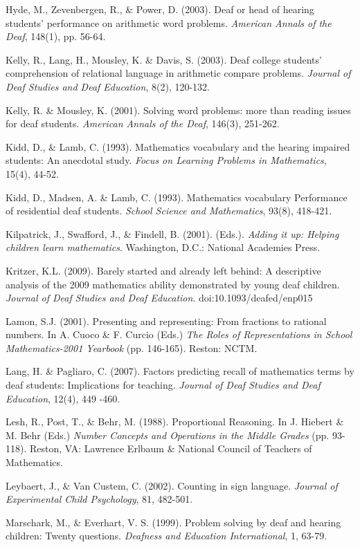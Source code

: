 \documentclass[11.5pt]{sig-alternate} %
\begin{document}
Hyde, M., Zevenbergen, R., \& Power, D. (2003). Deaf or head of hearing students' performance on arithmetic word problems. \textit{American Annals of the Deaf}, 148(1), pp. 56-64.

Kelly, R., Lang, H., Mousley, K. \& Davis, S. (2003). Deaf college students' comprehension of relational language in arithmetic compare problems. \textit{Journal of Deaf Studies and Deaf Education}, 8(2), 120-132.

Kelly, R. \& Mousley, K. (2001). Solving word problems: more than reading issues for deaf students. \textit{American Annals of the Deaf}, 146(3), 251-262.

Kidd, D., \& Lamb, C. (1993). Mathematics vocabulary and the hearing impaired students: An anecdotal study. \textit{Focus on Learning Problems in Mathematics}, 15(4), 44-52.

Kidd, D., Madsen, A. \& Lamb, C. (1993). Mathematics vocabulary Performance of residential deaf students. \textit{School Science and Mathematics}, 93(8), 418-421.

Kilpatrick, J., Swafford, J., \& Findell, B. (2001). (Eds.). \textit{Adding it up: Helping children learn mathematics}. Washington, D.C.: National Academies Press.

Kritzer, K.L. (2009). Barely started and already left behind: A descriptive analysis of the	2009 mathematics ability demonstrated by young deaf children. \textit{Journal of Deaf Studies and Deaf Education}. doi:10.1093/deafed/enp015

Lamon, S.J. (2001). Presenting and representing: From fractions to rational numbers. In A. Cuoco \& F. Curcio (Eds.) \textit{The Roles of Representations in School Mathematics-2001 Yearbook} (pp. 146-165). Reston: NCTM.

Lang, H. \& Pagliaro, C. (2007). Factors predicting recall of mathematics terms by deaf students: Implications for teaching. \textit{Journal of Deaf Studies and Deaf Education}, 12(4), 449 -460.

Lesh, R., Post, T., \& Behr, M. (1988). Proportional Reasoning. In J. Hiebert \& M. Behr (Eds.) \textit{Number Concepts and Operations in the Middle Grades} (pp. 93-118). Reston, VA: Lawrence Erlbaum \& National Council of Teachers of Mathematics.

Leybaert, J., \& Van Custem, C. (2002). Counting in sign language. \textit{Journal of Experimental Child Psychology}, 81, 482-501.

Marschark, M., \& Everhart, V. S. (1999). Problem solving by deaf and hearing children: Twenty questions. \textit{Deafness and Education International}, 1, 63-79.
\end{document}
